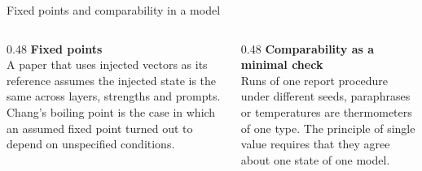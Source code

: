 \documentclass[aspectratio=169,11pt]{beamer}
\begin{document}
\begin{frame}[label=changmodel]{Fixed points and comparability in a model}
\begin{columns}[T]
\begin{column}{0.48\textwidth}
{\small\textbf{Fixed points}}\\[0.3em]
{\footnotesize A paper that uses injected vectors as its reference assumes the injected state is the same across layers, strengths and prompts. Chang's boiling point is the case in which an assumed fixed point turned out to depend on unspecified conditions.}
\end{column}
\begin{column}{0.48\textwidth}
{\small\textbf{Comparability as a minimal check}}\\[0.3em]
{\footnotesize Runs of one report procedure under different seeds, paraphrases or temperatures are thermometers of one type. The principle of single value requires that they agree about one state of one model.}
\end{column}
\end{columns}

\vspace{0.3em}
\begin{center}
\end{center}
\end{frame}
\end{document}
